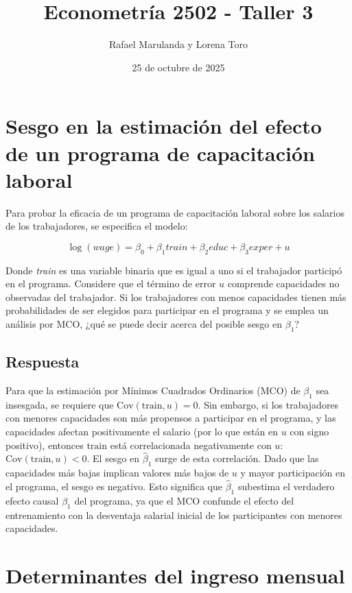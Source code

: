 \documentclass[12pt]{article}
\title{Econometría 2502 - Taller 3}
\author{Rafael Marulanda y Lorena Toro}
\date{25 de octubre de 2025}
\begin{document}
\maketitle

\section{Sesgo en la estimación del efecto de un programa de capacitación laboral}

Para probar la eficacia de un programa de capacitación laboral sobre los salarios de los trabajadores, se especifica el modelo:

\[
\log(wage) = \beta_{0} + \beta_{1}train + \beta_{2}educ + \beta_{3}exper + u
\]

Donde \textit{train} es una variable binaria que es igual a uno si el trabajador participó en el programa. Considere que el término de error $u$ comprende capacidades no observadas del trabajador. Si los trabajadores con menos capacidades tienen más probabilidades de ser elegidos para participar en el programa y se emplea un análisis por MCO, ¿qué se puede decir acerca del posible sesgo en $\beta_{1}$?

\subsection*{Respuesta}

Para que la estimación por Mínimos Cuadrados Ordinarios (MCO) de $\beta_1$ sea insesgada, se requiere que $\text{Cov}(\text{train}, u) = 0$. Sin embargo, si los trabajadores con menores capacidades son más propensos a participar en el programa, y las capacidades afectan positivamente el salario (por lo que están en $u$ con signo positivo), entonces $\text{train}$ está correlacionada negativamente con $u$: $\text{Cov}(\text{train}, u) < 0$.
El sesgo en $\hat{\beta}_1$ surge de esta correlación. Dado que las capacidades más bajas implican valores más bajos de $u$ y mayor participación en el programa, el sesgo es negativo. Esto significa que $\hat{\beta}_1$ subestima el verdadero efecto causal $\beta_1$ del programa, ya que el MCO confunde el efecto del entrenamiento con la desventaja salarial inicial de los participantes con menores capacidades.

\section{Determinantes del ingreso mensual}
\end{document}
